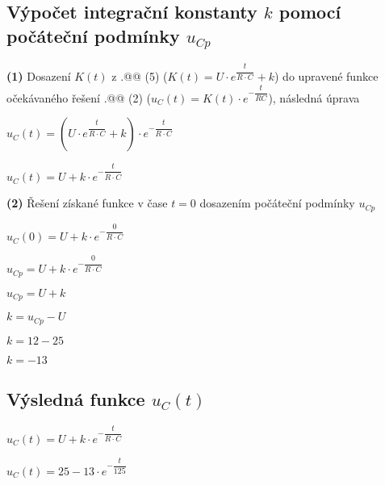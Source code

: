 \documentclass[a4paper,12pt]{article}
\makeatletter
\newcommand*{\rom}[1]{\expandafter\@slowromancap\romannumeral #1@}
\makeatother
\begin{document}
\subsection{Výpočet integrační konstanty $k$ pomocí počáteční podmínky $u_{Cp}$}
\hspace{1em}\textbf{(1)} Dosazení $K(t)$ z \rom{5.}\rom{5} (5) ($K(t)=U\cdot e^{\dfrac{t}{R\cdot C}}+k$) do upravené funkce očekávaného řešení \rom{5.}\rom{3} (2) ($u_C(t)=K(t)\cdot e^{-\dfrac{t}{RC}}$), následná úprava\par\vspace{0.5em}
$u_C(t)=(U\cdot e^{\dfrac{t}{R\cdot C}}+k)\cdot e^{-\dfrac{t}{R\cdot C}}$\par
$u_C(t)=U+k\cdot e^{-\dfrac{t}{R\cdot C}}$\par\vspace{1em}
\hspace{1em}\textbf{(2)} Řešení získané funkce v čase $t=0$ dosazením počáteční podmínky $u_{Cp}$\par\vspace{0.2em}
$u_C(0)=U+k\cdot e^{-\dfrac{0}{R\cdot C}}$\par
$u_{Cp}=U+k\cdot e^{-\dfrac{0}{R\cdot C}}$\par
$u_{Cp}=U+k$\par
$k=u_{Cp}-U$\par
$k=12-25$\par
$k=-13$\par\vspace{0.3em}
\subsection{Výsledná funkce $u_C(t)$}
$u_C(t)=U+k\cdot e^{-\dfrac{t}{R\cdot C}}$\par
$u_C(t)=25-13\cdot e^{-\dfrac{t}{125}}$\par\vspace{1.5em}
\end{document}
